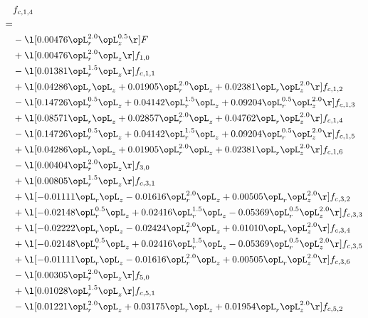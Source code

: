 \begin{alignat}{2} 
\label{eq:f_14_1} 
& f_{c,1,4} \nonumber \\ 
 = \\ 
& - \l[  0.00476 \opL_r^{2.0} \opL_z^{0.5}  \r] F \nonumber \\ 
& + \l[  0.00476 \opL_r^{2.0} \opL_z  \r] f_{1,0} \nonumber \\ 
& - \l[  0.01381 \opL_r^{1.5} \opL_z  \r] f_{c,1,1} \nonumber \\ 
& + \l[  0.04286 \opL_r \opL_z +  0.01905 \opL_r^{2.0} \opL_z +  0.02381 \opL_r \opL_z^{2.0}  \r] f_{c,1,2} \nonumber \\ 
& - \l[  0.14726 \opL_r^{0.5} \opL_z +  0.04142 \opL_r^{1.5} \opL_z +  0.09204 \opL_r^{0.5} \opL_z^{2.0}  \r] f_{c,1,3} \nonumber \\ 
& + \l[  0.08571 \opL_r \opL_z +  0.02857 \opL_r^{2.0} \opL_z +  0.04762 \opL_r \opL_z^{2.0}  \r] f_{c,1,4} \nonumber \\ 
& - \l[  0.14726 \opL_r^{0.5} \opL_z +  0.04142 \opL_r^{1.5} \opL_z +  0.09204 \opL_r^{0.5} \opL_z^{2.0}  \r] f_{c,1,5} \nonumber \\ 
& + \l[  0.04286 \opL_r \opL_z +  0.01905 \opL_r^{2.0} \opL_z +  0.02381 \opL_r \opL_z^{2.0}  \r] f_{c,1,6} \nonumber \\ 
& - \l[  0.00404 \opL_r^{2.0} \opL_z  \r] f_{3,0} \nonumber \\ 
& + \l[  0.00805 \opL_r^{1.5} \opL_z  \r] f_{c,3,1} \nonumber \\ 
& + \l[  -0.01111 \opL_r \opL_z   -0.01616 \opL_r^{2.0} \opL_z +  0.00505 \opL_r \opL_z^{2.0}  \r] f_{c,3,2} \nonumber \\ 
& + \l[  -0.02148 \opL_r^{0.5} \opL_z +  0.02416 \opL_r^{1.5} \opL_z   -0.05369 \opL_r^{0.5} \opL_z^{2.0}  \r] f_{c,3,3} \nonumber \\ 
& + \l[  -0.02222 \opL_r \opL_z   -0.02424 \opL_r^{2.0} \opL_z +  0.01010 \opL_r \opL_z^{2.0}  \r] f_{c,3,4} \nonumber \\ 
& + \l[  -0.02148 \opL_r^{0.5} \opL_z +  0.02416 \opL_r^{1.5} \opL_z   -0.05369 \opL_r^{0.5} \opL_z^{2.0}  \r] f_{c,3,5} \nonumber \\ 
& + \l[  -0.01111 \opL_r \opL_z   -0.01616 \opL_r^{2.0} \opL_z +  0.00505 \opL_r \opL_z^{2.0}  \r] f_{c,3,6} \nonumber \\ 
& - \l[  0.00305 \opL_r^{2.0} \opL_z  \r] f_{5,0} \nonumber \\ 
& + \l[  0.01028 \opL_r^{1.5} \opL_z  \r] f_{c,5,1} \nonumber \\ 
& - \l[  0.01221 \opL_r^{2.0} \opL_z +  0.03175 \opL_r \opL_z +  0.01954 \opL_r \opL_z^{2.0}  \r] f_{c,5,2} \nonumber \\ 

\end{alignat}

